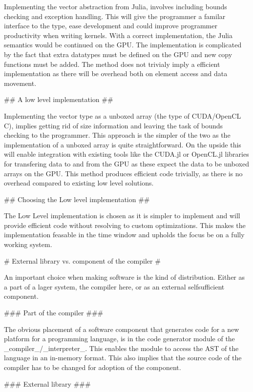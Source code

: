 \begin{markdown}
Implementing the vector abstraction from Julia, involves including
bounds checking and exception handling. This will give the programmer
a familar interface to the type, ease development and could improve
programmer productivity when writing kernels. With a correct
implementation, the Julia semantics would be continued on the GPU. The
implementation is complicated by the fact that extra datatypes must be
defined on the GPU and new copy functions must be added. The method
does not trivialy imply a efficient implementation as there will be
overhead both on element access and data movement.

## A low level implementation ##
\label{sec:meth:arrays:low-level}

Implementing the vector type as a unboxed array (the type of
CUDA/OpenCL C), implies getting rid of size information and leaving
the task of bounds checking to the programmer. This approach is the
simpler of the two as the implementation of a unboxed array is quite
straightforward. On the upside this will enable integration with
existing tools like the CUDA.jl or OpenCL.jl libraries for transfering
data to and from the GPU as these expect the data to be unboxed arrays
on the GPU. This method produces efficient code trivially, as there is
no overhead compared to existing low level solutions.

## Choosing the Low level implementation ##

The Low Level implementation is chosen as it is simpler to implement
and will provide efficient code without resolving to custom
optimizations. This makes the implementation feasable in the time
window and upholds the focus be on a fully working system.

# External library vs. component of the compiler #
\label{sec:meth:lib-b-comp}

An important choice when making software is the kind of
distribution. Either as a part of a lager system, the compiler here,
or as an external selfsufficient component.

### Part of the compiler ###

The obvious placement of a software component that generates code for
a new platform for a programming language, is in the code generator
module of the _compiler_/_interpreter_. This enables the module to
access the AST of the language in an in-memory format. This also
implies that the source code of the compiler has to be changed for
adoption of the component.

### External library ###


\end{markdown}
